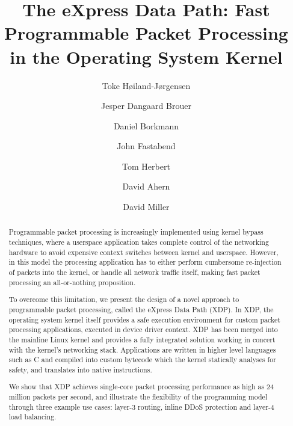 \documentclass[sigconf]{acmart}
\begin{document}
\title{The eXpress Data Path: Fast Programmable Packet Processing in the Operating System Kernel}
\author{Toke Høiland-Jørgensen}

\author{Jesper Dangaard Brouer}

\author{Daniel Borkmann}

\author{John Fastabend}

\author{Tom Herbert}

\author{David Ahern}

\author{David Miller}

\renewcommand{\shortauthors}{T. Høiland-Jørgensen et al.}
\renewcommand{\shorttitle}{The eXpress Data Path}
\captionsetup{font+=small}

\begin{abstract}
  Programmable packet processing is increasingly implemented using kernel bypass
  techniques, where a userspace application takes complete control of the
  networking hardware to avoid expensive context switches between kernel and
  userspace. However, in this model the processing application has to either
  perform cumbersome re-injection of packets into the kernel, or handle all
  network traffic itself, making fast packet processing an all-or-nothing
  proposition.

  To overcome this limitation, we present the design of a novel approach to
  programmable packet processing, called the eXpress Data Path (XDP). In XDP,
  the operating system kernel itself provides a safe execution environment for
  custom packet processing applications, executed in device driver context. XDP
  has been merged into the mainline Linux kernel and provides a fully integrated
  solution working in concert with the kernel's networking stack. Applications
  are written in higher level languages such as C and compiled into custom
  bytecode which the kernel statically analyses for safety, and translates into
  native instructions.

  We show that XDP achieves single-core packet processing performance as high as
  24 million packets per second, and illustrate the flexibility of the
  programming model through three example use cases: layer-3 routing, inline
  DDoS protection and layer-4 load balancing.
\end{abstract}
\end{document}
